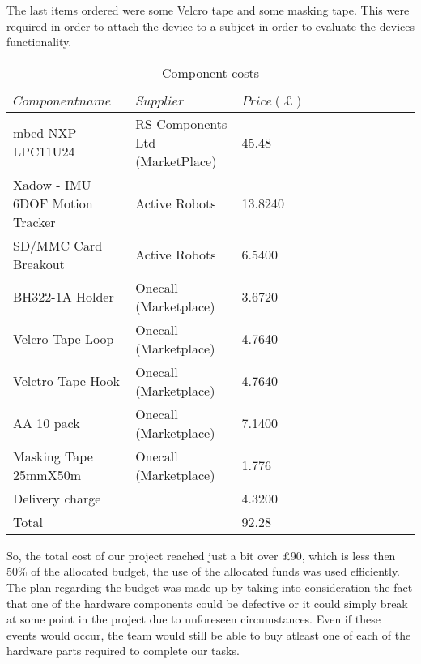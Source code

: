 The last items ordered were some Velcro tape and some masking tape. This were required in order to attach the device to a subject in order to evaluate the devices functionality.
\begin{table}[h]
	\centering
	\begin{tabular}{lllllllllll}
		\hline
		$Component name$ & $Supplier$ & $Price(\pounds)$ \\
		\hline
		mbed NXP LPC11U24 & RS Components Ltd (MarketPlace) & 45.48\\
		\hline
		Xadow - IMU 6DOF Motion Tracker & Active Robots & 13.8240 \\
		\hline
		SD/MMC Card Breakout & Active Robots & 6.5400 \\
		\hline
		BH322-1A  Holder &  Onecall (Marketplace) & 3.6720 \\
		\hline
		Velcro Tape Loop &  Onecall (Marketplace) & 4.7640 \\
		\hline
		Velctro Tape Hook &  Onecall (Marketplace) & 4.7640 \\
		\hline
		AA 10 pack &  Onecall (Marketplace) & 7.1400 \\
		\hline
		Masking Tape 25mmX50m &  Onecall (Marketplace) &1.776 \\
		\hline 
		Delivery charge &  & 4.3200	\\
		\hline	
		Total &  & 92.28 \\
	\end{tabular}
	\caption{Component costs}
	\label{table: 1}
\end{table}

So, the total cost of our project reached just a bit over £90, which is less then 50\% of the allocated budget,  the use of the allocated funds was used efficiently. The plan regarding the budget was made up by taking into consideration the fact that one of the hardware components could be defective or it could simply break at some point in the project due to unforeseen circumstances. Even if these events would occur, the team would still be able to buy atleast one of each of the hardware parts required to complete our tasks.